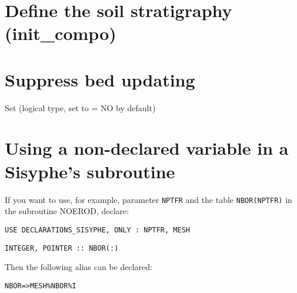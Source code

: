 \section{Define the soil stratigraphy (init\_compo)}

\section{Suppress bed updating}
Set  (logical type, set to {\ttfamily = NO} by default)           


\section{Using a non-declared variable in a Sisyphe's subroutine}
If you want to use, for example, parameter \texttt{NPTFR} and the table \texttt{NBOR(NPTFR)} in the subroutine NOEROD,
declare:

\texttt{USE DECLARATIONS\_SISYPHE, ONLY : NPTFR, MESH}

\texttt{INTEGER, POINTER :: NBOR(:)}

Then the following alias can be declared:

\texttt{NBOR=>MESH\%NBOR\%I}
